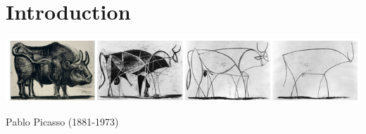 \chapter{Introduction}\label{chap:intro}
\includegraphics[width=\textwidth]{Picasso-Bull-Progression-cropped.png}
\begin{flushright}
Pablo Picasso (1881-1973)\end{flushright}

